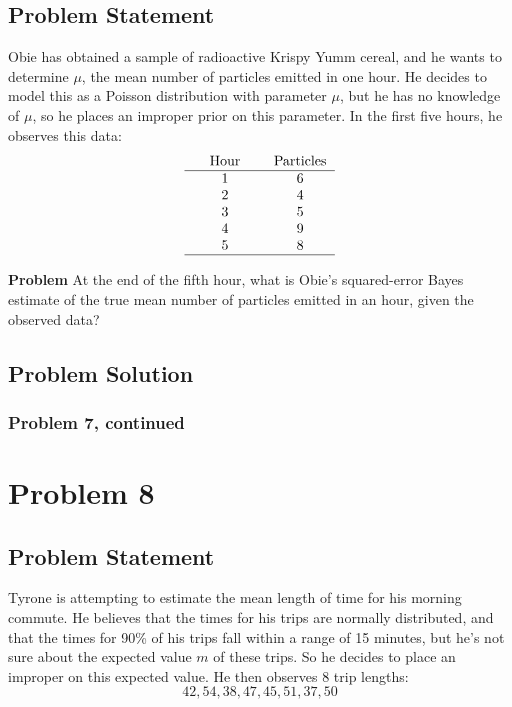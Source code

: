 \documentclass[12pt]{article}
\theoremstyle{definition}
\begin{document}
\subsection*{Problem Statement}

Obie has obtained a sample of radioactive Krispy Yumm cereal, and he wants to determine $\mu$, the mean number of particles emitted in one hour. He decides to model this as a Poisson distribution with parameter $\mu$, but he has no knowledge of $\mu$, so he places an improper prior on this parameter. In the first five hours, he observes this data:
$$
\begin{tabular}{ccccc}
& Hour & & Particles\\
\hline
& 1 & & 6\\
& 2 & & 4\\
& 3 & & 5\\
& 4 & & 9\\
& 5 & & 8\\
\hline
\end{tabular}
$$

\bigskip
\noindent
{\bf Problem} At the end of the fifth hour, what is Obie's squared-error Bayes estimate of the true mean number of particles emitted in an hour, given the observed data?


\subsection*{Problem Solution}


\newpage
\subsubsection*{Problem 7, continued}




\newpage
\section*{Problem 8}

\subsection*{Problem Statement}

Tyrone is attempting to estimate the mean length of time for his morning commute. He believes that the times for his trips are normally distributed, and that the times for 90\% of his trips fall within a range of 15 minutes, but he's not sure about the expected value $m$ of these trips. So he decides to place an improper on this expected value. He then observes 8 trip lengths:
$$
42, 54, 38, 47, 45, 51, 37, 50
$$
\end{document}
